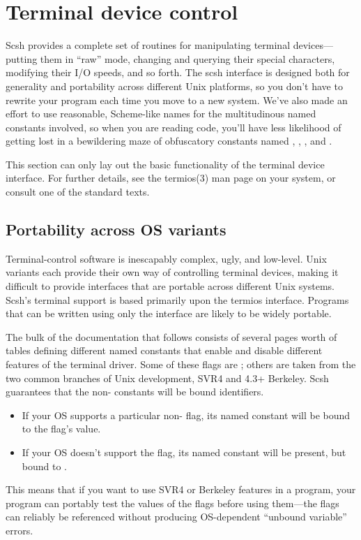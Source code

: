 
\section{Terminal device control}
\label{sect:tty}

\newcommand{\fr}[1]{\makebox[0pt][r]{#1}}

Scsh provides a complete set of routines for manipulating terminal
devices---putting them in ``raw'' mode, changing and querying their
special characters, modifying their I/O speeds, and so forth.
The scsh interface is designed both for generality and portability
across different Unix platforms, so you don't have to rewrite your
program each time you move to a new system.
We've also made an effort to use reasonable, Scheme-like names for
the multitudinous named constants involved, so when you are reading
code, you'll have less likelihood of getting lost in a bewildering
maze of obfuscatory constants named , , ,
and .

This section can only lay out the basic functionality of the terminal
device interface.
For further details, see the termios(3) man page on your system,
or consult one of the standard {\Unix} texts.

\subsection{Portability across OS variants}
Terminal-control software is inescapably complex, ugly, and low-level.
Unix variants each provide their own way of controlling terminal
devices, making it difficult to provide interfaces that are
portable across different Unix systems.
Scsh's terminal support is based primarily upon the {\Posix} termios
interface.
Programs that can be written using only the {\Posix} interface are likely
to be widely portable.

The bulk of the documentation that follows consists of several pages worth
of tables defining different named constants that enable and disable different
features of the terminal driver.
Some of these flags are {\Posix}; others are taken from the two common
branches of Unix development, SVR4 and 4.3+ Berkeley.
Scsh guarantees that the non-{\Posix} constants will be bound identifiers.
\begin{itemize}
\item If your OS supports a particular non-{\Posix} flag, 
      its named constant will be bound to the flag's value.
\item If your OS doesn't support the flag, its named constant
      will be present, but bound to \sharpf.
\end{itemize}
This means that if you want to use SVR4 or Berkeley features in a program,
your program can portably test the values of the flags before using 
them---the flags can reliably be referenced without producing OS-dependent
``unbound variable'' errors.

